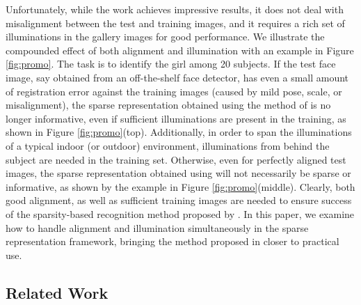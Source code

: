 \documentclass[10pt,journal,letterpaper,compsoc]{IEEEtran} %
\begin{document}
Unfortunately, while the work \cite{Wright2009-PAMI} achieves impressive results, it does not deal with misalignment
between the test and training images, and it requires a rich set of illuminations
in the gallery images for good performance.
We illustrate the compounded effect of both alignment and illumination
with an example in Figure \ref{fig:promo}.
The task is to identify the girl among 20 subjects. If the test
face image, say obtained from an off-the-shelf face detector,
has even a small amount of registration error against the
training images (caused by mild pose, scale, or misalignment),
the sparse representation obtained using the method of \cite{Wright2009-PAMI} is no longer informative,
even if sufficient illuminations are present in the training, as shown in Figure
\ref{fig:promo}(top). Additionally, in order to span
the illuminations of a typical indoor (or outdoor) environment,
illuminations from behind the subject are needed in the
training set. Otherwise, even for perfectly aligned test images,
the sparse representation obtained using \cite{Wright2009-PAMI} will not necessarily be sparse or
informative, as shown by the example in Figure
\ref{fig:promo}(middle). Clearly, both good alignment, as well
as sufficient training images are needed to ensure success of the sparsity-based
recognition method proposed by \cite{Wright2009-PAMI}.
In this paper, we examine how to handle alignment and illumination simultaneously
in the sparse representation framework, bringing the method proposed in \cite{Wright2009-PAMI}
closer to practical use.

\subsection{Related Work}
\end{document}
